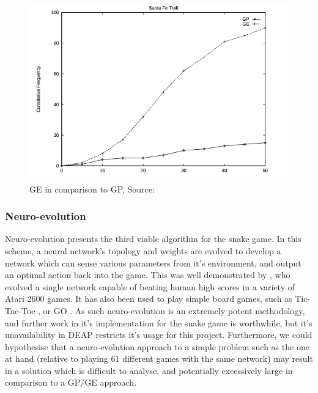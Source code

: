 \documentclass[british,10pt,a4paper]{article}
\begin{document}
\begin{figure}
\centering
	\includegraphics[width=12cm,keepaspectratio]{images/gp_vs_ge.png}
	\caption{GE in comparison to GP, Source: \cite{Michael_ONeill1999-zi}}
	\label{fig:gp_vs_ge}
\end{figure}

\subsubsection{Neuro-evolution}
Neuro-evolution presents the third viable algorithm for the snake game. In this scheme, a neural network's topology and weights are evolved to develop a network which can sense various parameters from it's environment, and output an optimal action back into the game. This was well demonstrated by \citet{Hausknecht2014-uc}, who evolved a single network capable of beating human high scores in a variety of Atari 2600 games. It has also been used to play simple board games, such as Tic-Tac-Toe \cite{Fogel1993-qp}, or GO \cite{Richards1998-si}. As such neuro-evolution is an extremely potent methodology, and further work in it's implementation for the snake game is worthwhile, but it's unavailability in DEAP restricts it's usage for this project. Furthermore, we could hypothesise that a neuro-evolution approach to a simple problem such as the one at hand (relative to playing 61 different games with the same network) may result in a solution which is difficult to analyse, and potentially excessively large in comparison to a GP/GE approach.
\end{document}
